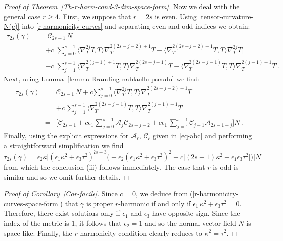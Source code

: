\documentclass[11pt]{amsart}
\theoremstyle{plain}
\theoremstyle{definition}
\numberwithin{equation}{section}
\begin{document}
\begin{proof}[Proof of Theorem~\ref{Th-r-harm-cond-3-dim-space-form}]
Now we deal with the general case $r \geq 4$. First, we suppose that $r=2s$ is even. Using \eqref{tensor-curvature-N(c)} into \eqref{r-harmonicity-curves} and separating even and odd indices we obtain:
\[
\begin{aligned}
\tau_{2s}(\gamma)  = &\; {\mathcal C}_{2s-1}\,N \\
&+c\Big [\sum_{j=0}^{s-1}  \langle \nabla_T^{2j} T,T \rangle\nabla_T^{2(2s-j-2)+1} T -\langle \nabla_T^{2(2s-j-2)+1} T,T \rangle \nabla_T^{2j} T \Big]\\
&  -c\Big [\sum_{j=1}^{s-1}  \langle \nabla_T^{2(j-1)+1} T,T \rangle\nabla_T^{2(2s-j-1)} T -\langle \nabla_T^{2(2s-j-1)} T,T \rangle \nabla_T^{2(j-1)+1} T \Big].
\end{aligned}
\] 
Next, using Lemma~\ref{lemma-Branding-nablaelle-pseudo} we find:
\begin{eqnarray*}
\tau_{2s}(\gamma) & = &{\mathcal C}_{2s-1}\,N +c\sum_{j=0}^{s-1}  \langle \nabla_T^{2j} T,T \rangle\nabla_T^{2(2s-j-2)+1} T \\
&  &+c\,\sum_{j=1}^{s-1} \langle \nabla_T^{2(2s-j-1)} T,T \rangle \nabla_T^{2(j-1)+1} T \\
& =& \Big [{\mathcal C}_{2s-1}+c\epsilon_1\,\sum_{j=0}^{s-1}{\mathcal A}_{j}{\mathcal C}_{2s-j-2}+ c\epsilon_1\,\sum_{j=1}^{s-1}{\mathcal C}_{j-1}{\mathcal A}_{2s-1-j}\Big ] N\,.
\end{eqnarray*} 
Finally, using the explicit expressions for ${\mathcal A}_{\ell},\,{\mathcal C}_{\ell}$ given in \eqref{eq-abc} and performing a straightforward simplification we find
\begin{equation*}
\tau_{2s}(\gamma)= \epsilon_2 \kappa \Big [(\epsilon_1 \kappa^2 + \epsilon_3 \tau^2)^{2s-3}\Big(- \epsilon_2  (\epsilon_1  \kappa^2 + \epsilon_3  \tau^2)^2 + c \big [  (2s - 1) \kappa^2 +\epsilon_1 \epsilon_3 \tau^2 \big ]\Big) \Big ] N
\end{equation*}
from which the conclusion (iii) follows immediately. The case that $r$ is odd is similar and so we omit further details.
\end{proof}


\begin{proof}[Proof of Corollary~\ref{Cor-facile}]
Since $c = 0$, we deduce from (\ref{r-harmonicity-curves-space-form}) that $\gamma$ is proper $r$-harmonic if and only if $\epsilon_1 \, \kappa^2 + \epsilon_3 \tau^2 = 0$. Therefore, there exist solutions only if $\epsilon_1$ and $\epsilon_3$ have opposite sign. Since the index of the metric is $1$, it follows that $\epsilon_2 = 1$ and so the normal vector field $N$ is space-like. Finally, the $r$-harmonicity condition clearly reduces to $\kappa^2 = \tau^2$.
\end{proof}
\end{document}
